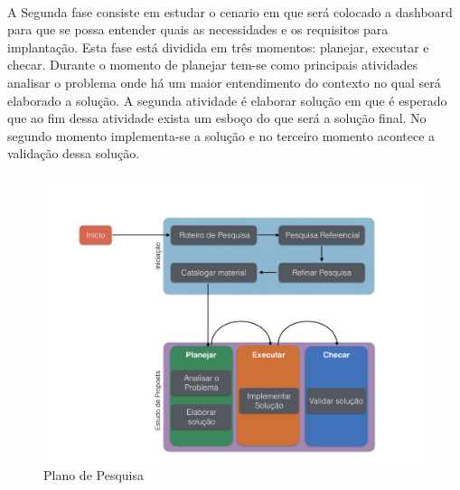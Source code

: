 \\A Segunda fase consiste em estudar o cenario em que será colocado a dashboard para que se possa entender quais as necessidades e os requisitos para implantação. Esta fase está dividida em três momentos: planejar,  executar e checar. Durante o momento de planejar tem-se como principais atividades analisar o problema onde há um maior entendimento do contexto no qual será elaborado a solução. A segunda atividade é elaborar solução em que é esperado que ao fim dessa atividade exista um esboço do que será a solução final. No segundo momento implementa-se a solução e no terceiro momento acontece a validação dessa solução.
\graphicspath{{figuras/}}
\begin{figure}
\centering
\includegraphics[scale=0.40]{TCCMetodologia}
\caption{Plano de Pesquisa}
\label{Rotulo}
\end{figure}

